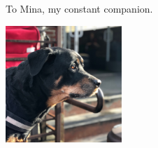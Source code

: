 
\thispagestyle{empty}

\begin{center}
To Mina, my constant companion.

\includegraphics[width=0.33\textwidth]{mina.jpg}

\end{center}

\setlength{\abovedisplayskip}{-5pt}
\setlength{\abovedisplayshortskip}{-5pt}
